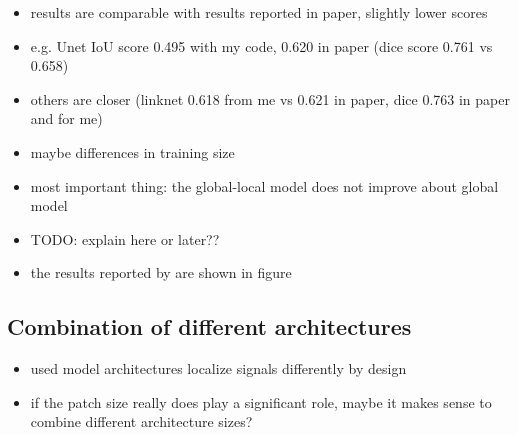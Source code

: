 \begin{itemize}
	\item results are comparable with results reported in paper, slightly lower scores
	\item e.g. Unet IoU score 0.495 with my code, 0.620 in paper (dice score 0.761 vs 0.658)
	\item others are closer (linknet 0.618 from me vs 0.621 in paper, dice 0.763 in paper and for me)
	\item maybe differences in training size
	\item most important thing: the global-local model does not improve about global model
	\item TODO: explain here or later??
	\item the results reported by \citeauthor{Oota_2023_WACV} are shown in figure
\end{itemize}


\subsection{Combination of different architectures}

\begin{itemize}
	\item used model architectures localize signals differently by design
	\item if the patch size really does play a significant role, maybe it makes sense to combine different architecture sizes?
\end{itemize}
